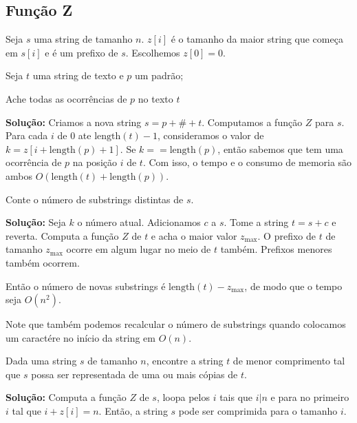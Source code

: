 \subsection{Função Z}

Seja $s$ uma string de tamanho $n$. $z[i]$ é o tamanho da maior string que começa em $s[i]$ e é um prefixo de $s$. Escolhemos $z[0] = 0$.


Seja $t$ uma string de texto e $p$ um padrão;

 Ache todas as ocorrências de $p$ no texto $t$

\textbf{Solução:} Criamos a nova string $s = p + \# + t$. Computamos a função $Z$ para $s$. Para cada $i$ de $0$ ate $\text{length}(t)-1$, consideramos o valor de $k = z[i + \text{length}(p)+1]$. Se $k == \text{length}(p)$, então sabemos que tem uma ocorrência de $p$ na posição $i$ de $t$. Com isso, o tempo e o consumo de memoria são ambos $O(\text{length}(t) + \text{length}(p))$.

 Conte o número de substrings distintas de $s$.

\textbf{Solução:} Seja $k$ o número atual. Adicionamos $c$ a $s$. Tome a string $t = s + c$ e reverta. Computa a função $Z$ de $t$ e acha o maior valor $z_{\max}$. O prefixo de $t$ de tamanho $z_{\max}$ ocorre em algum lugar no meio de $t$ também. Prefixos menores também ocorrem.

Então o número de novas substrings é $\text{length}(t) - z_{\max}$, de modo que o tempo seja $O(n^2)$.

Note que também podemos recalcular o número de substrings quando colocamos um caractére no início da string em $O(n)$.

 Dada uma string $s$ de tamanho $n$, encontre a string $t$ de menor comprimento tal que $s$ possa ser representada de uma ou mais cópias de $t$.

\textbf{Solução:} Computa a função $Z$ de $s$, loopa pelos $i$ tais que $i | n$ e para no primeiro $i$ tal que $i + z[i] = n$. Então, a string $s$ pode ser comprimida para o tamanho $i$.
